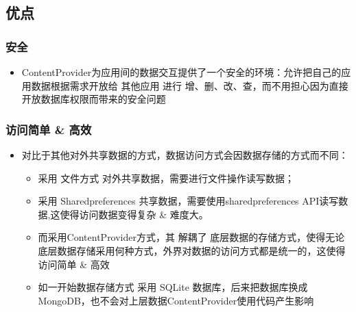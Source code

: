 \documentclass[9pt, b5paper]{article}
\begin{document}
\subsection{优点}
\label{sec-1-8}
\subsubsection{安全}
\label{sec-1-8-1}
\begin{itemize}
\item ContentProvider为应用间的数据交互提供了一个安全的环境：允许把自己的应用数据根据需求开放给 其他应用 进行 增、删、改、查，而不用担心因为直接开放数据库权限而带来的安全问题
\end{itemize}
\subsubsection{访问简单 \& 高效}
\label{sec-1-8-2}
\begin{itemize}
\item 对比于其他对外共享数据的方式，数据访问方式会因数据存储的方式而不同：
\begin{itemize}
\item 采用 文件方式 对外共享数据，需要进行文件操作读写数据；
\item 采用 Sharedpreferences 共享数据，需要使用sharedpreferences API读写数据,这使得访问数据变得复杂 \& 难度大。
\item 而采用ContentProvider方式，其 解耦了 底层数据的存储方式，使得无论底层数据存储采用何种方式，外界对数据的访问方式都是统一的，这使得访问简单 \& 高效
\item 如一开始数据存储方式 采用 SQLite 数据库，后来把数据库换成 MongoDB，也不会对上层数据ContentProvider使用代码产生影响
\end{itemize}
\end{itemize}
\end{document}
